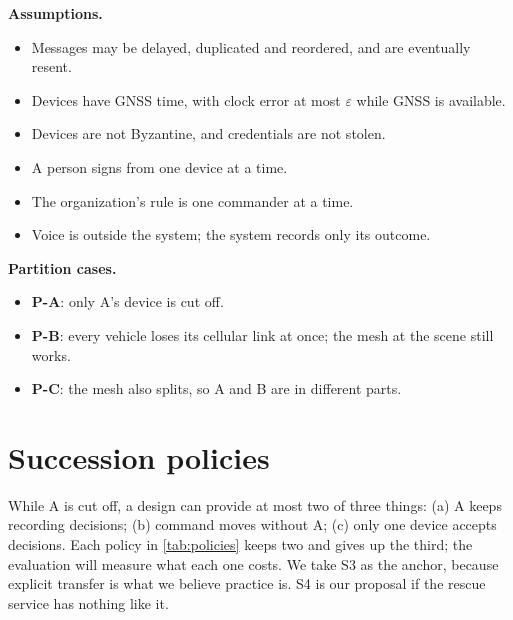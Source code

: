 \documentclass[11pt,a4paper]{article}
\begin{document}
\textbf{Assumptions.}
\begin{itemize}
  \item Messages may be delayed, duplicated and reordered, and are eventually resent.
  \item Devices have GNSS time, with clock error at most $\varepsilon$ while GNSS is available.
  \item Devices are not Byzantine, and credentials are not stolen.
  \item A person signs from one device at a time.
  \item The organization's rule is one commander at a time.
  \item Voice is outside the system; the system records only its outcome.
\end{itemize}

\textbf{Partition cases.}
\begin{itemize}
  \item \textbf{P-A}: only A's device is cut off.
  \item \textbf{P-B}: every vehicle loses its cellular link at once; the mesh at the scene still
        works.
  \item \textbf{P-C}: the mesh also splits, so A and B are in different parts.
\end{itemize}

\section{Succession policies}
\label{sec:policies}

While A is cut off, a design can provide at most two of three things: (a) A keeps
recording decisions; (b) command moves without A; (c) only one device accepts decisions.
Each policy in \cref{tab:policies} keeps two and gives up the third; the evaluation will
measure what each one costs. We take S3 as the anchor, because explicit transfer is what we
believe practice is. S4 is our proposal if the rescue service has nothing like it.
\end{document}
